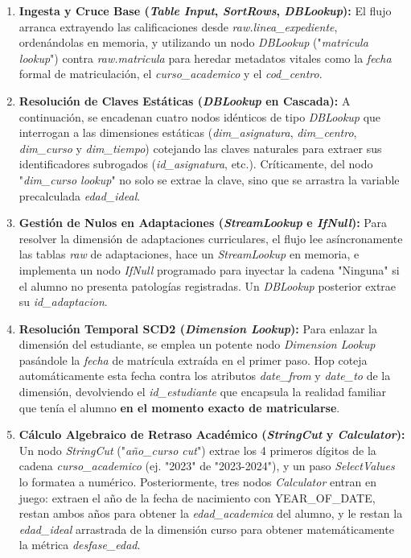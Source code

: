 \begin{enumerate}
    \item \textbf{Ingesta y Cruce Base (\textit{Table Input}, \textit{SortRows}, \textit{DBLookup}):} El flujo arranca extrayendo las calificaciones desde \textit{raw.linea\_expediente}, ordenándolas en memoria, y utilizando un nodo \textit{DBLookup} ("\textit{matricula lookup}") contra \textit{raw.matricula} para heredar metadatos vitales como la \textit{fecha} formal de matriculación, el \textit{curso\_academico} y el \textit{cod\_centro}.
    \item \textbf{Resolución de Claves Estáticas (\textit{DBLookup} en Cascada):} A continuación, se encadenan cuatro nodos idénticos de tipo \textit{DBLookup} que interrogan a las dimensiones estáticas (\textit{dim\_asignatura}, \textit{dim\_centro}, \textit{dim\_curso} y \textit{dim\_tiempo}) cotejando las claves naturales para extraer sus identificadores subrogados (\textit{id\_asignatura}, etc.). Críticamente, del nodo "\textit{dim\_curso lookup}" no solo se extrae la clave, sino que se arrastra la variable precalculada \textit{edad\_ideal}.
    \item \textbf{Gestión de Nulos en Adaptaciones (\textit{StreamLookup} e \textit{IfNull}):} Para resolver la dimensión de adaptaciones curriculares, el flujo lee asíncronamente las tablas \textit{raw} de adaptaciones, hace un \textit{StreamLookup} en memoria, e implementa un nodo \textit{IfNull} programado para inyectar la cadena "Ninguna" si el alumno no presenta patologías registradas. Un \textit{DBLookup} posterior extrae su \textit{id\_adaptacion}.
    \item \textbf{Resolución Temporal SCD2 (\textit{Dimension Lookup}):} Para enlazar la dimensión del estudiante, se emplea un potente nodo \textit{Dimension Lookup} pasándole la \textit{fecha} de matrícula extraída en el primer paso. Hop coteja automáticamente esta fecha contra los atributos \textit{date\_from} y \textit{date\_to} de la dimensión, devolviendo el \textit{id\_estudiante} que encapsula la realidad familiar que tenía el alumno \textbf{en el momento exacto de matricularse}.
    \item \textbf{Cálculo Algebraico de Retraso Académico (\textit{StringCut} y \textit{Calculator}):} Un nodo \textit{StringCut} ("\textit{año\_curso cut}") extrae los 4 primeros dígitos de la cadena \textit{curso\_academico} (ej. "2023" de "2023-2024"), y un paso \textit{SelectValues} lo formatea a numérico. Posteriormente, tres nodos \textit{Calculator} entran en juego: extraen el año de la fecha de nacimiento con YEAR\_OF\_DATE, restan ambos años para obtener la \textit{edad\_academica} del alumno, y le restan la \textit{edad\_ideal} arrastrada de la dimensión curso para obtener matemáticamente la métrica \textit{desfase\_edad}.

\end{enumerate}
